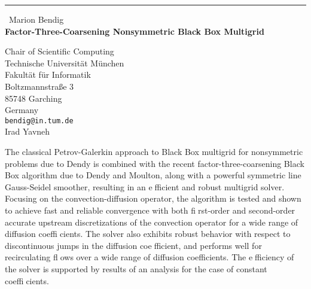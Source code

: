 \documentclass{report}
\begin{document}
\begin{center}
\rule{6in}{1pt} \
{\large Marion Bendig \\
{\bf Factor-Three-Coarsening Nonsymmetric Black Box Multigrid }}

Chair of Scientific Computing \\ Technische Universit\"at M\"unchen \\ Fakult\"at f\"ur Informatik \\ Boltzmannstra\ss{}e 3 \\ 85748 Garching \\ Germany
\\
{\tt bendig@in.tum.de}\\
Irad Yavneh\end{center}

The classical Petrov-Galerkin approach to Black Box multigrid for
nonsymmetric problems due to Dendy is combined with the recent
factor-three-coarsening Black Box algorithm due to Dendy and Moulton,
along with a powerful symmetric line Gauss-Seidel
smoother, resulting in an efficient and robust multigrid solver.
Focusing on the convection-diffusion operator, the algorithm is tested
and shown to achieve fast and reliable convergence with both first-order
and second-order accurate upstream discretizations of the convection
operator for a wide range of diffusion coefficients. The solver also
exhibits robust behavior with respect to discontinuous jumps in the
diffusion coefficient, and performs well for recirculating flows over a
wide range of diffusion coefficients. The efficiency of the solver is
supported by results of an analysis for the case of constant
coefficients.
\end{document}
